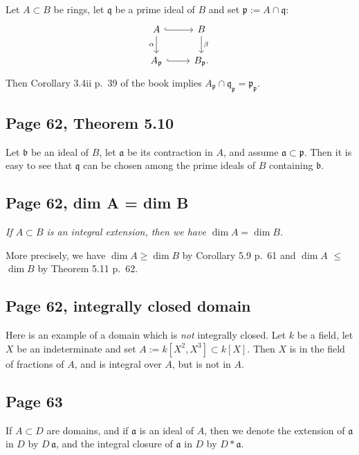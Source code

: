 \documentclass[parskip=half,fontsize=12pt]{scrartcl}%
\newcommand{\mf}{\mathfrak}
\newcommand{\ppp}{\mf p}
\begin{document}
Let $A\subset B$ be rings, let $\mf q$ be a prime ideal of $B$ and set $\ppp:=A\cap\mf q$:
$$
\begin{tikzcd}
A\ar[d,"\alpha"']\ar[r,hook]&B\ar[d,"\beta"]\\ 
A_\ppp\ar[r,hook]&B_\ppp.
\end{tikzcd}
$$
Then Corollary 3.4ii p.~39 of the book implies $A_\ppp\cap\mf q_\ppp=\ppp_\ppp$.

\subsection{Page 62, Theorem 5.10}%

Let $\mf b$ be an ideal of $B$, let $\mf a$ be its contraction in $A$, and assume $\mf a\subset\ppp$. Then it is easy to see that $\mf q$ can be chosen among the prime ideals of $B$ containing $\mf b$.

\subsection{Page 62, dim A = dim B}%

\emph{If $A\subset B$ is an integral extension, then we have $\dim A=\dim B$.}

More precisely, we have $\dim A\ge\dim B$ by Corollary 5.9 p.~61 and $\dim A$ $\le$ $\dim B$ by Theorem 5.11 p.~62.

\subsection{Page 62, integrally closed domain}%

Here is an example of a domain which is \emph{not} integrally closed. Let $k$ be a field, let $X$ be an indeterminate and set $A:=k[X^2,X^3]\subset k[X]$. Then $X$ is in the field of fractions of $A$, and is integral over $A$, but is not in $A$.

\subsection{Page 63}%

If $A\subset D$ are domains, and if $\mf a$ is an ideal of $A$, then we denote the extension of $\mf a$ in $D$ by $D\,\mf a$, and the integral closure of $\mf a$ in $D$ by $D*\mf a$. 
\end{document}
